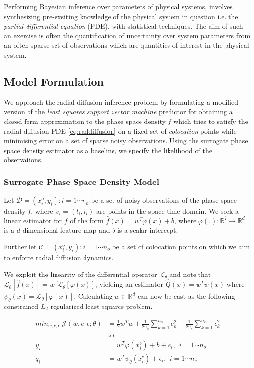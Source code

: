 \documentclass{article}
\begin{document}
Performing Bayesian inference over parameters of physical systems,
involves synthesizing pre-exsiting knowledge of the physical system in
question i.e. the \emph{partial differential equation} (PDE), with
statistical techniques. The aim of such an exercise is often the
quantification of uncertainty over system parameters from an often
sparse set of observations which are quantities of interest in the
physical system. 


\subsection{Model Formulation}

We approach the radial diffusion inference problem by formulating a
modified version of the \emph{least squares support vector machine}
predictor for obtaining a closed form approximation to the phase space
density $f$ which tries to satisfy the radial diffusion PDE
\ref{eq:raddiffusion} on a fixed set of \emph{colocation} points while
minimising error on a set of sparse noisy observations. 
Using the surrogate phase space density estimator as a baseline, we
specify the likelihood of the observations.


\subsubsection*{Surrogate Phase Space Density Model}

Let $\mathcal{D}={(x^{o}_{i}, y_{i}): i = 1 \cdots n_{o}}$ be a set of
noisy observations of the phase space density $f$, where $x_{i} =
(l_{i}, t_{i})$ are points in the space time domain. We seek a linear
estimator for $f$ of the form $\hat{f}(x) = w^{T}\varphi(x) + b$,
where $\varphi(.): \mathbb{R}^{2} \rightarrow \mathbb{R}^{d}$ is a $d$
dimensional feature map and $b$ is a scalar intercept.

Further let $\mathcal{C} ={(x^{o}_{i}, y_{i}): i = 1 \cdots n_{o}}$ be 
a set of colocation points on which we aim to enforce radial diffusion
dynamics.

We exploit the linearity of the differential operator
$\mathcal{L}_{\theta}$ and note that $\mathcal{L}_{\theta} [\hat{f}(x)]
= w^{T} \mathcal{L}_{\theta}[\varphi(x)]$, yielding an estimator
$\hat{Q}(x) = w^{T}\psi(x)$ where $\psi_{\theta}(x) =
\mathcal{L}_{\theta}[\varphi(x)]$. Calculating $w \in \mathbb{R}^d$
can now be cast as the following constrained $L_2$ regularized 
least squares problem.

\begin{align}\label{eq:surrogate}
   min_{w,e,\epsilon} \ \mathcal{J}(w,e,\epsilon;\theta) &= 
   \frac{1}{2} w^{T}w + \frac{1}{2\gamma_{o}} \sum_{k = 1}^{n_{o}}{e^{2}_{k}} + \frac{1}{2\gamma_{c}} \sum_{k = 1}^{n_{c}}{\epsilon^{2}_{k}} \\
  & s.t \nonumber \\
  y_{i} & = w^{T}\varphi(x^{o}_{i}) + b + e_{i}, \ \ i = 1 \cdots n_{o} \\
  q_{i} & = w^{T}\psi_{\theta}(x^{c}_{i}) + \epsilon_{i}, \ \ i = 1 \cdots n_{c}
\end{align}
\end{document}
